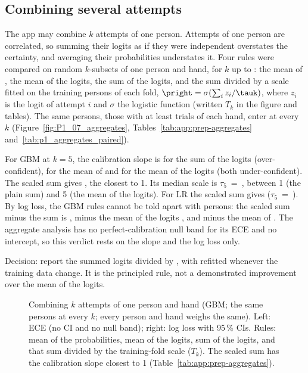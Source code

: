 \subsection{Combining several attempts}\label{app:prep:aggregates}

The app may combine $k$ attempts of one person. Attempts of one person are correlated, so summing their
logits as if they were independent overstates the certainty, and averaging their probabilities understates
it. Four rules were compared on random $k$-subsets of one person and hand, for $k$ up to :
the mean of \pright{}, the mean of the logits, the sum of the logits, and the sum divided by a scale
\tauk{} fitted on the training persons of each fold, $\pright = \sigma(\sum_i z_i / \tauk)$, where $z_i$ is
the logit of attempt $i$ and $\sigma$ the logistic function (written $T_k$ in the figure and tables). The
same  persons, those with at least  trials of each hand, enter at every
$k$
(Figure~\ref{fig:P1_07_aggregates}, Tables~\ref{tab:app:prep-aggregates} and~\ref{tab:p1_aggregates_paired}).

For GBM at $k = 5$, the calibration slope is  for the sum of the
logits (over-confident),  for the mean of \pright{} and
 for the mean of the logits (both under-confident). The scaled sum
gives , the closest to 1. Its median scale is
$\tau_5$~=~, between 1 (the plain sum) and 5 (the mean of the logits). For LR the
scaled sum gives  ($\tau_5$~=~).
By log loss, the GBM rules cannot be told apart with  persons: the scaled sum minus the sum is
, minus the mean of the logits , and
minus the mean of \pright{} .
The aggregate analysis has no perfect-calibration null band for its ECE and no intercept, so this verdict
rests on the slope and the log loss only.

Decision: report the summed logits divided by \tauk{}, with \tauk{} refitted whenever the training data
change. It is the principled rule, not a demonstrated improvement over the mean of the logits.

\begin{figure}[htbp]
\centering
{}
\caption{Combining $k$ attempts of one person and hand (GBM; the same  persons at
every $k$; every person and hand weighs the same). Left: ECE (no CI and no null band); right: log loss with
95\,\% CIs. Rules: mean of the probabilities, mean of the logits, sum of the logits, and that sum divided by
the training-fold scale \tauk{} ($T_k$). The scaled sum has the calibration slope closest to 1
(Table~\ref{tab:app:prep-aggregates}).}
\label{fig:P1_07_aggregates}\label{fig:app:prep-aggregates}
\end{figure}

